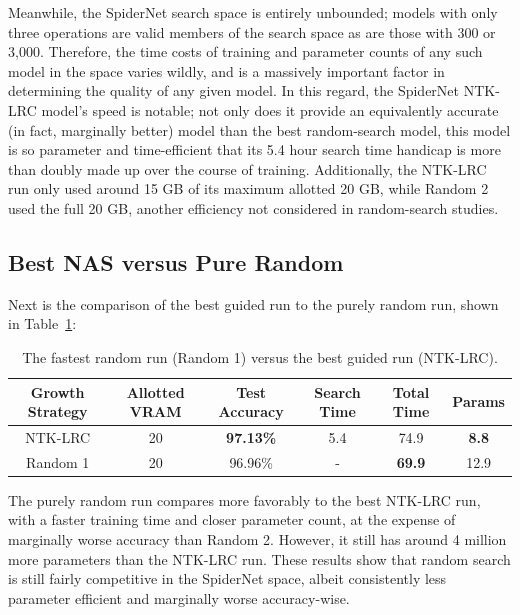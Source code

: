 Meanwhile, the SpiderNet search space is entirely unbounded; models with
only three operations are valid members of the search space as are those with 300 or 3,000. Therefore, the time costs of training and parameter
counts of any such model in the space varies wildly, and is a massively important factor in determining the quality of any given model. In this
regard, the SpiderNet NTK-LRC model's speed is notable; not only does it provide an equivalently accurate (in fact,
marginally better) model than the best random-search model, this model is so parameter and time-efficient that its 5.4 hour
search time handicap is more than doubly made up over the course of training. Additionally, the NTK-LRC run only used around
15 GB of its maximum allotted 20 GB, while Random 2 used the full 20 GB, another efficiency not considered in random-search studies.


\subsection{Best NAS versus Pure Random}
Next is the comparison of the best guided run to the purely random run, shown in Table~\ref{tab:spider_rand1}:
\begin{table}[ht!]
\begin{center}
\begin{tabular}{c|c|c|c|c|c}
    Growth Strategy & Allotted VRAM & Test Accuracy    & Search Time  & Total Time & Params \\
    \hline
    NTK-LRC         & 20       & \textbf{97.13\%} & 5.4          & 74.9                 & \textbf{8.8}    \\
    Random 1        & 20       & 96.96\%          & -            & \textbf{69.9}       & 12.9   \\
\end{tabular}
\end{center}
\caption[The fastest random run versus the best guided run]{The fastest random run (Random 1) versus the best guided run (NTK-LRC).}
\label{tab:spider_rand1}
\end{table}

The purely random run compares more favorably to the best NTK-LRC run, with a faster training time and closer
parameter count, at the expense of marginally worse accuracy than Random 2. However, it still has around 4 million
more parameters than the NTK-LRC run. These results show that random search is still fairly competitive
in the SpiderNet space, albeit consistently less parameter efficient and marginally worse accuracy-wise.

